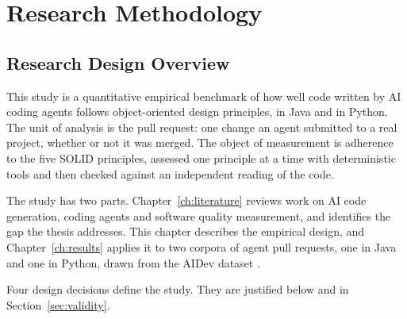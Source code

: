 \chapter{Research Methodology}
\label{ch:methodology}
\newpage

\section{Research Design Overview}
\label{sec:design-overview}

This study is a quantitative empirical benchmark of how well code written by AI coding agents
follows object-oriented design principles, in Java and in Python. The unit of analysis is the pull request: one change an
agent submitted to a real project, whether or not it was merged. The object of measurement is
adherence to the five SOLID principles, assessed one principle at a time with deterministic tools
and then checked against an independent reading of the code.

The study has two parts. Chapter~\ref{ch:literature} reviews work on AI code generation, coding
agents and software quality measurement, and identifies the gap the thesis addresses. This chapter
describes the empirical design, and Chapter~\ref{ch:results} applies it to two corpora of agent pull
requests, one in Java and one in Python, drawn from the AIDev dataset \citep{li2025aidev}.

Four design decisions define the study. They are justified below and in Section~\ref{sec:validity}.


